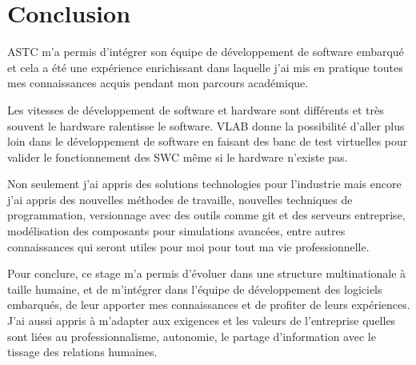 \section{Conclusion}
ASTC m'a permis d'intégrer son équipe de développement de software embarqu\'e et cela a \'et\'e une expérience enrichissant dans laquelle j'ai mis en pratique toutes mes connaissances acquis pendant mon parcours académique.

Les vitesses de développement de software et hardware sont différents et tr\`es souvent le hardware ralentisse le software. VLAB donne la possibilit\'e d'aller plus loin dans le développement de software en faisant des banc de test virtuelles pour valider le fonctionnement des SWC même si le hardware n'existe pas.

Non seulement j'ai appris des solutions technologies pour l'industrie mais encore j'ai appris des nouvelles méthodes de travaille, nouvelles techniques de programmation, versionnage avec des outils comme git et des serveurs entreprise, modélisation des composants pour simulations avanc\'ees, entre autres connaissances qui seront utiles pour moi pour tout ma vie professionnelle.

Pour conclure, ce stage m’a permis d’évoluer dans une structure multinationale à taille humaine, et de m’intégrer dans l’équipe de développement des logiciels embarqués, de leur apporter mes connaissances et de profiter de leurs expériences. J’ai aussi appris à m’adapter aux exigences et les valeurs de l’entreprise quelles sont liées au professionnalisme, autonomie, le partage d’information avec le tissage des relations humaines.



